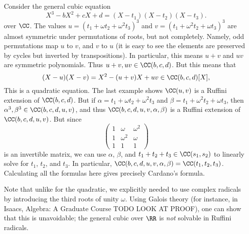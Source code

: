 \begin{example}
	Consider the general cubic equation
	\[ X^3 - bX^2 + cX + d = (X - t_1)(X - t_2)(X - t_3). \]
	over $\CC$. The values $u = (t_1 + \omega t_2 + \omega^2 t_3)^3$ and $v = (t_1 + \omega^2 t_2 + \omega t_3)^3$ are almost symmetric under permutations of roots, but not completely. Namely, odd permutations map $u$ to $v$, and $v$ to $u$ (it is easy to see the elements are preserved by cycles but inverted by transpositions). In particular, this means $u + v$ and $uv$ are symmetric polynomials. Thus $u + v, uv \in \CC(b,c,d)$. But this means that
	\[ (X - u)(X - v) = X^2 - (u + v) X + uv \in \CC(b,c,d)[X], \]
	This is a quadratic equation. The last example shows $\CC(u,v)$ is a Ruffini extension of $\CC(b,c,d)$. But if $\alpha = t_1 + \omega t_2 + \omega^2 t_3$ and $\beta = t_1 + \omega^2 t_2 + \omega t_3$, then $\alpha^3, \beta^3 \in \CC(b,c,d,u,v)$, and thus $\CC(b,c,d,u,v,\alpha,\beta)$ is a Ruffini extension of $\CC(b,c,d,u,v)$. But since
	\[ \begin{pmatrix} 1 & \omega & \omega^2 \\ 1 & \omega^2 & \omega \\ 1 & 1 & 1 \end{pmatrix} \]
	is an invertible matrix, we can use $\alpha$, $\beta$, and $t_1 + t_2 + t_3 \in \CC(s_1,s_2)$ to linearly solve for $t_1$, $t_2$, and $t_3$. In particular, $\CC(b,c,d,u,v,\alpha,\beta) = \CC(t_1,t_2,t_3)$. Calculating all the formulas here gives precisely Cardano's formula.
\end{example}

\begin{remark}
	Note that unlike for the quadratic, we explicitly needed to use complex radicals by introducing the third roots of unity $\omega$. Using Galois theory (for instance, in Isaacs, Algebra: A Graduate Course TODO LOOK AT PROOF), one can show that this is unavoidable; the general cubic over $\RR$ is \emph{not} solvable in Ruffini radicals.
\end{remark}

